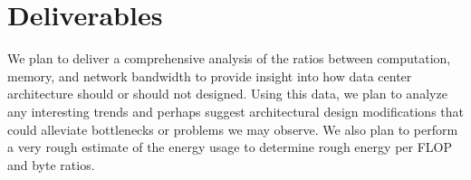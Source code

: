 \documentclass{article}
\begin{document}

\section{Deliverables}

We plan to deliver a comprehensive analysis of the ratios between computation, memory, and network bandwidth to provide insight into how data center architecture should or should not designed.
Using this data, we plan to analyze any interesting trends and perhaps suggest architectural design modifications that could alleviate bottlenecks or problems we may observe.
We also plan to perform a very rough estimate of the energy usage to determine rough energy per FLOP and byte ratios.





\end{document}
